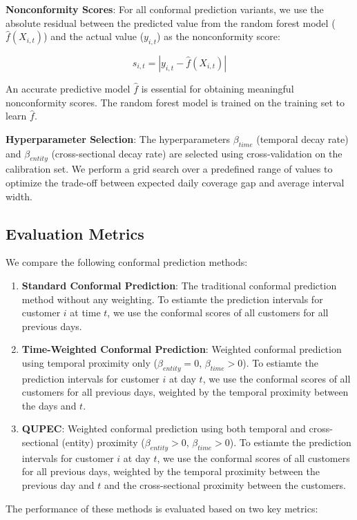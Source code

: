 \textbf{Nonconformity Scores}: For all conformal prediction variants, we use the absolute residual between the predicted value from the random forest model ($\hat{f}(X_{i,t})$) and the actual value ($y_{i,t}$) as the nonconformity score:

$$s_{i,t} = |y_{i,t} - \hat{f}(X_{i,t})|$$

An accurate predictive model $\hat{f}$ is essential for obtaining meaningful nonconformity scores. The random forest model is trained on the training set to learn $\hat{f}$.

\textbf{Hyperparameter Selection}: The hyperparameters $\beta_{time}$ (temporal decay rate) and $\beta_{entity}$ (cross-sectional decay rate) are selected using cross-validation on the calibration set. We perform a grid search over a predefined range of values to optimize the trade-off between expected daily coverage gap and average interval width.

\subsection{Evaluation Metrics}

We compare the following conformal prediction methods:

\begin{enumerate}
\item \textbf{Standard Conformal Prediction}: The traditional conformal prediction method without any weighting. To estiamte the prediction intervals for customer $i$ at time $t$, we use the conformal scores of all customers for all previous days.
\item \textbf{Time-Weighted Conformal Prediction}: Weighted conformal prediction using temporal proximity only ($\beta_{entity} = 0$, $\beta_{time} > 0$). To estiamte the prediction intervals for customer $i$ at day $t$, we use the conformal scores of all customers for all previous days, weighted by the temporal proximity between the days and $t$.
\item \textbf{QUPEC}: Weighted conformal prediction using both temporal and cross-sectional (entity) proximity ($\beta_{entity} > 0$, $\beta_{time} > 0$). To estiamte the prediction intervals for customer $i$ at day $t$, we use the conformal scores of all customers for all previous days, weighted by the temporal proximity between the previous day and $t$ and the cross-sectional proximity between the customers.
\end{enumerate}

The performance of these methods is evaluated based on two key metrics:

